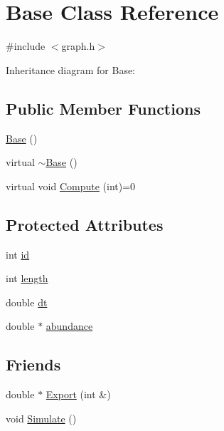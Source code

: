 \hypertarget{class_base}{\section{Base Class Reference}
\label{class_base}
}


{\ttfamily \#include $<$graph.\-h$>$}



Inheritance diagram for Base\-:
\subsection*{Public Member Functions}
\begin{DoxyCompactItemize}
\item 
\hyperlink{class_base_a5ffe0568374d8b9b4c4ec32953fd6453}{Base} ()
\item 
virtual \hyperlink{class_base_a722da881b6c70cfcbde9243abcfbf334}{$\sim$\-Base} ()
\item 
virtual void \hyperlink{class_base_a2539be60a003bf1153a87444870cfc50}{Compute} (int)=0
\end{DoxyCompactItemize}
\subsection*{Protected Attributes}
\begin{DoxyCompactItemize}
\item 
int \hyperlink{class_base_af46b05bd03228ba15d40a05c15abffa0}{id}
\item 
int \hyperlink{class_base_afc939d650ee448e4b9e9302fdd8e6dae}{length}
\item 
double \hyperlink{class_base_a4c2c4261e4f2d0e7ebaf93bde00d3a26}{dt}
\item 
double $\ast$ \hyperlink{class_base_a262c09f4273320c819d77ec15a895980}{abundance}
\end{DoxyCompactItemize}
\subsection*{Friends}
\begin{DoxyCompactItemize}
\item 
double $\ast$ \hyperlink{class_base_a50c933a62458087717ab7406e4cf01bc}{Export} (int \&)
\item 
void \hyperlink{class_base_a868cf38fedb3c52291069b74bb198bf0}{Simulate} ()
\end{DoxyCompactItemize}


